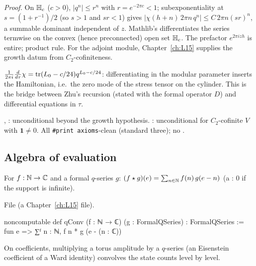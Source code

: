 \noindent\emph{Proof.} On $\mathbb{H}_c$ ($c>0$), $|q^n|\le r^n$ with $r = e^{-2\pi c}<1$; subexponentiality at
$s = (1+r^{-1})/2$ (so $s>1$ and $sr<1$) gives $|\chi(h+n)\,2\pi n\,q^n|\le C\,2\pi n(sr)^n$, a summable dominant
independent of $z$. Mathlib's  differentiates the series termwise on the convex
(hence preconnected) open set $\mathbb{H}_c$. The prefactor $e^{2\pi izh}$ is entire; product rule. For the adjoint
module, Chapter~\ref{ch:L15} supplies the growth datum from $C_2$-cofiniteness.
\begin{physics}
$\frac{1}{2\pi i}\frac{d}{d\tau}\chi = \operatorname{tr}(L_0 - c/24)q^{L_0-c/24}$: differentiating in the modular parameter inserts the
Hamiltonian, i.e.\ the zero mode of the stress tensor on the cylinder. This is the bridge between Zhu's recursion (stated
with the formal operator $D$) and differential equations in $\tau$.
\end{physics}
\begin{status}
, : unconditional beyond the growth hypothesis. :
unconditional for $C_2$-cofinite $V$ with $\mathbf 1\neq0$. All \texttt{\#print axioms}-clean (standard three); no
.
\end{status}

\subsection{Algebra of evaluation}

\begin{definition}\label{l14:def:qConv}
For $f:{\mathbb{N}}\to{\mathbb{C}}$ and a formal $q$-series $g$: $(f\star g)(e) = \sum_{n\in{\mathbb{N}}}f(n)\,g(e-n)$ (a : $0$ if the support
is infinite).
\end{definition}
\noindent File  (a Chapter~\ref{ch:L15} file).
\begin{leancode}
noncomputable def qConv (f : ℕ → ℂ) (g : FormalQSeries) : FormalQSeries :=
  fun e => ∑ᶠ n : ℕ, f n * g (e - (n : ℂ))
\end{leancode}
\begin{physics}
On coefficients, multiplying a torus amplitude by a $q$-series (an Eisenstein coefficient of a Ward identity) convolves the state counts level by level.
\end{physics}

